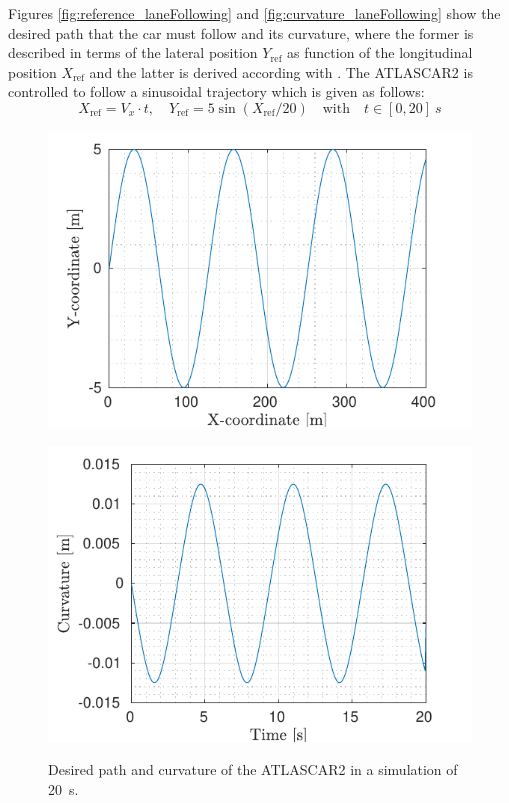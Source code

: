 Figures \ref{fig:reference_laneFollowing} and \ref{fig:curvature_laneFollowing} show the desired path that the car must follow and its curvature, where the former is described in terms of the lateral position $Y_{\text{ref}}$ as function of the longitudinal position $X_{\text{ref}}$ and the latter is derived according with \cite{curvature}. The ATLASCAR2 is controlled to follow a sinusoidal trajectory which is given as follows:
\begin{equation}
X_\text{ref}=V_x\cdot t, \quad Y_\text{ref}=5\sin(X_\text{ref}/20)\quad \text{with}\quad t\in[0,20]\SI{}{s}
\end{equation}
\begin{figure}[!t]
	\centering
	\begin{minipage}[t]{0.49\textwidth}
		\includegraphics[width=\textwidth]{../../MATLAB/lane_following/figure/Reference.pdf}
		\subcaption{}
		\label{fig:reference_laneFollowing}
	\end{minipage}
	\begin{minipage}[t]{0.49\textwidth}
		\includegraphics[width=\textwidth]{../../MATLAB/lane_following/figure/Curvature.pdf}
		\subcaption{}
		\label{fig:curvature_laneFollowing}
	\end{minipage}
	\caption{Desired path and curvature of the ATLASCAR2 in a simulation of \SI{20}{s}.}
	\label{fig:laneFollowing_desired}
\end{figure}

